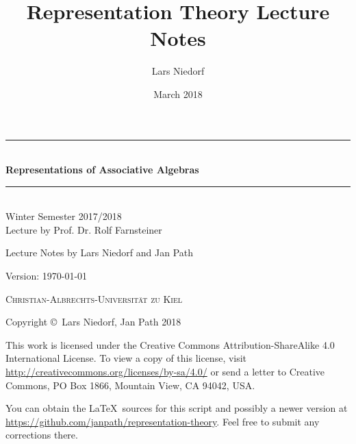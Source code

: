 \documentclass{template}
\title{Representation Theory Lecture Notes}
\author{Lars Niedorf}
\date{March 2018}
\begin{document}
\pagestyle{plain}

\begin{titlepage}

	\newcommand{\HRule}{\rule{\linewidth}{0.5mm}}
	\center

	\vspace*{20mm}

	\vfill
	\HRule \\[0.8cm]
	{\LARGE\textbf{Representations of Associative Algebras}}\\[0.3cm]
	\HRule \\[1.5cm]

	Winter Semester 2017/2018\\[1.5cm]

	Lecture by Prof. Dr. Rolf Farnsteiner

	\vfill

	Lecture Notes by Lars Niedorf and Jan Path

	Version: \today \\[3cm]

	\vfill

	\textsc{Christian-Albrechts-Universität zu Kiel}\\[1.5cm]

\end{titlepage}


Copyright \copyright\ Lars Niedorf, Jan Path 2018

This work is licensed under the Creative Commons Attribution-ShareAlike 4.0
International License. To view a copy of this license, visit
\url{http://creativecommons.org/licenses/by-sa/4.0/} or send a letter to
Creative Commons, PO Box 1866, Mountain View, CA 94042, USA.

You can obtain the \LaTeX\ sources for this script and possibly a newer version
at \url{https://github.com/janpath/representation-theory}. Feel free to submit
any corrections there.

\thispagestyle{empty}

\newpage


\frontmatter
\tableofcontents


\mainmatter
\pagestyle{headings}


























\backmatter
\printbibliography
\nocite{*}
\printindex
\end{document}
